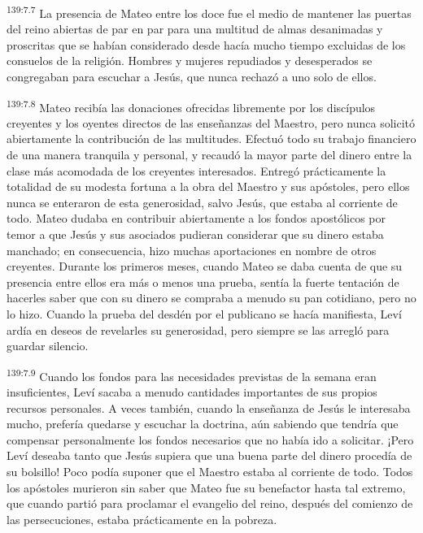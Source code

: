 \par 
\textsuperscript{139:7.7} La presencia de Mateo entre los doce fue el medio de mantener las puertas del reino abiertas de par en par para una multitud de almas desanimadas y proscritas que se habían considerado desde hacía mucho tiempo excluidas de los consuelos de la religión. Hombres y mujeres repudiados y desesperados se congregaban para escuchar a Jesús, que nunca rechazó a uno solo de ellos.

\par 
\textsuperscript{139:7.8} Mateo recibía las donaciones ofrecidas libremente por los discípulos creyentes y los oyentes directos de las enseñanzas del Maestro, pero nunca solicitó abiertamente la contribución de las multitudes. Efectuó todo su trabajo financiero de una manera tranquila y personal, y recaudó la mayor parte del dinero entre la clase más acomodada de los creyentes interesados. Entregó prácticamente la totalidad de su modesta fortuna a la obra del Maestro y sus apóstoles, pero ellos nunca se enteraron de esta generosidad, salvo Jesús, que estaba al corriente de todo. Mateo dudaba en contribuir abiertamente a los fondos apostólicos por temor a que Jesús y sus asociados pudieran considerar que su dinero estaba manchado; en consecuencia, hizo muchas aportaciones en nombre de otros creyentes. Durante los primeros meses, cuando Mateo se daba cuenta de que su presencia entre ellos era más o menos una prueba, sentía la fuerte tentación de hacerles saber que con su dinero se compraba a menudo su pan cotidiano, pero no lo hizo. Cuando la prueba del desdén por el publicano se hacía manifiesta, Leví ardía en deseos de revelarles su generosidad, pero siempre se las arregló para guardar silencio.

\par 
\textsuperscript{139:7.9} Cuando los fondos para las necesidades previstas de la semana eran insuficientes, Leví sacaba a menudo cantidades importantes de sus propios recursos personales. A veces también, cuando la enseñanza de Jesús le interesaba mucho, prefería quedarse y escuchar la doctrina, aún sabiendo que tendría que compensar personalmente los fondos necesarios que no había ido a solicitar. ¡Pero Leví deseaba tanto que Jesús supiera que una buena parte del dinero procedía de su bolsillo! Poco podía suponer que el Maestro estaba al corriente de todo. Todos los apóstoles murieron sin saber que Mateo fue su benefactor hasta tal extremo, que cuando partió para proclamar el evangelio del reino, después del comienzo de las persecuciones, estaba prácticamente en la pobreza.

